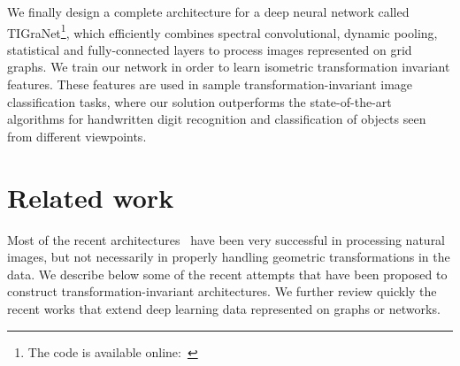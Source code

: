 \documentclass[10pt,journal,compsoc]{IEEEtran}
\newcommand{\renata}[1]{\textcolor{black}{#1}}
\begin{document}
	We finally design a complete architecture for a deep neural network called TIGraNet\footnote{The code is available online:~}, which efficiently combines spectral convolutional, dynamic pooling, statistical and fully-connected layers to process images represented on grid graphs. We train our network in order to learn isometric transformation invariant features. These features are used in sample transformation-invariant image classification tasks, where our solution outperforms the state-of-the-art algorithms for handwritten digit recognition and classification of objects seen from different viewpoints.

	\section{Related work}
	\label{s:related_work}

	Most of the recent architectures~\cite{bb:lecun98gradient, bb:krizhevsky2012imagenetNIPS2012} have been very successful in processing natural images, but not necessarily in properly handling geometric transformations in the data. We describe below some of the recent attempts that have been proposed to construct transformation-invariant architectures. We further review quickly the recent works that extend deep learning data represented on graphs or networks.
\end{document}
